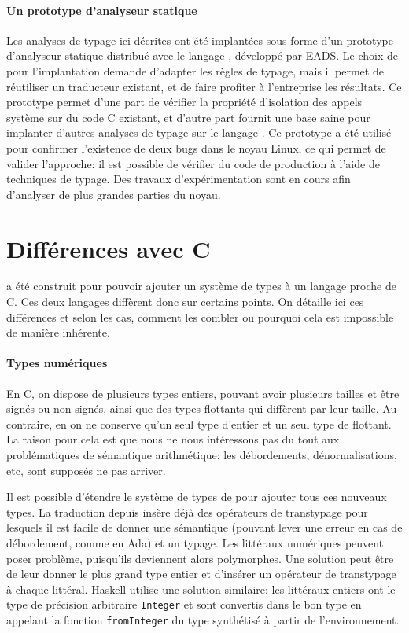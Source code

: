 \paragraph{Un prototype d'analyseur statique}

Les analyses de typage ici décrites ont été implantées sous forme d'un prototype
d'analyseur statique distribué avec le langage \newspeak, développé par EADS. Le
choix de \newspeak pour l'implantation demande d'adapter les règles de typage,
mais il permet de réutiliser un traducteur existant, et de faire profiter à
l'entreprise les résultats. Ce prototype permet d'une part de vérifier la
propriété d'isolation des appels système sur du code C existant, et d'autre part
fournit une base saine pour implanter d'autres analyses de typage sur le langage
\newspeak. Ce prototype a été utilisé pour confirmer l'existence de deux bugs
dans le noyau Linux, ce qui permet de valider l'approche: il est possible de
vérifier du code de production à l'aide de techniques de typage. Des travaux
d'expérimentation sont en cours afin d'analyser de plus grandes parties du
noyau.

\section{Différences avec C}

\langname a été construit pour pouvoir ajouter un système de types à un langage
proche de C. Ces deux langages diffèrent donc sur certains points. On détaille
ici ces différences et selon les cas, comment les combler ou pourquoi cela est
impossible de manière inhérente.

\paragraph{Types numériques}

En C, on dispose de plusieurs types entiers, pouvant avoir plusieurs tailles et
être signés ou non signés, ainsi que des types flottants qui diffèrent par leur
taille. Au contraire, en \langname{} on ne conserve qu'un seul type d'entier et
un seul type de flottant. La raison pour cela est que nous ne nous intéressons
pas du tout aux problématiques de sémantique arithmétique: les débordements,
dénormalisations, etc, sont supposés ne pas arriver.

Il est possible d'étendre le système de types de \langname{} pour ajouter tous
ces nouveaux types. La traduction depuis \newspeak insère déjà des opérateurs de
transtypage pour lesquels il est facile de donner une sémantique (pouvant lever
une erreur en cas de débordement, comme en Ada) et un typage. Les littéraux
numériques peuvent poser problème, puisqu'ils deviennent alors polymorphes. Une
solution peut être de leur donner le plus grand type entier et d'insérer un
opérateur de transtypage à chaque littéral. Haskell utilise une solution
similaire: les littéraux entiers ont le type de précision arbitraire
\texttt{Integer} et sont convertis dans le bon type en appelant la fonction
\texttt{fromInteger} du type synthétisé à partir de l'environnement.

